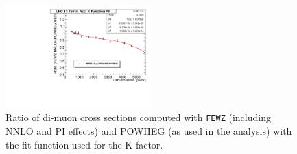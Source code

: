 \begin{figure}[htbp]
\centering
\includegraphics[width=0.5\textwidth]{Images/Cap5/lhc-mm-FEWZovPOWHEG-fit.pdf}
\caption{Ratio of di-muon cross sections computed with \mbox{{\tt FEWZ}} 
(including NNLO and PI effects) and POWHEG (as used in the analysis) with the fit function used for the K factor.}
\label{fig:dypi}
\end{figure}

